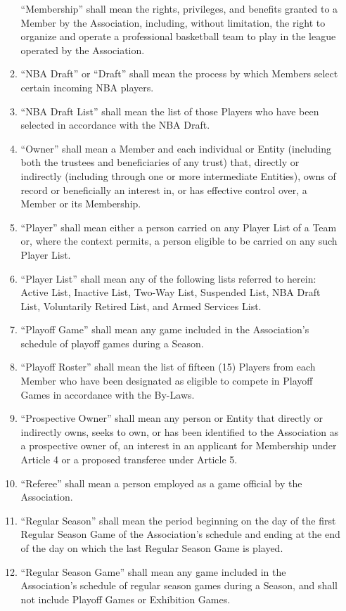 \documentclass[]{book}
\begin{document}
\begin{enumerate}
\begin{enumerate}
    ``Membership'' shall mean the rights, privileges, and benefits granted to a Member by the Association, including, without limitation, the right to organize and operate a professional basketball team to play in the league operated by the Association.
  \item
    ``NBA Draft'' or ``Draft'' shall mean the process by which Members select certain incoming NBA players.
  \item
    ``NBA Draft List'' shall mean the list of those Players who have been selected in accordance with the NBA Draft.
  \item
    ``Owner'' shall mean a Member and each individual or Entity (including both the trustees and beneficiaries of any trust) that, directly or indirectly (including through one or more intermediate Entities), owns of record or beneficially an interest in, or has effective control over, a Member or its Membership.
  \item
    ``Player'' shall mean either a person carried on any Player List of a Team or, where the context permits, a person eligible to be carried on any such Player List.
  \item
    ``Player List'' shall mean any of the following lists referred to herein: Active List, Inactive List, Two-Way List, Suspended List, NBA Draft List, Voluntarily Retired List, and Armed Services List.
  \item
    ``Playoff Game'' shall mean any game included in the Association's schedule of playoff games during a Season.
  \item
    ``Playoff Roster'' shall mean the list of fifteen (15) Players from each Member who have been designated as eligible to compete in Playoff Games in accordance with the By-Laws.
  \item
    ``Prospective Owner'' shall mean any person or Entity that directly or indirectly owns, seeks to own, or has been identified to the Association as a prospective owner of, an interest in an applicant for Membership under Article 4 or a proposed transferee under Article 5.
  \item
    ``Referee'' shall mean a person employed as a game official by the Association.
  \item
    ``Regular Season'' shall mean the period beginning on the day of the first Regular Season Game of the Association's schedule and ending at the end of the day on which the last Regular Season Game is played.
  \item
    ``Regular Season Game'' shall mean any game included in the Association's schedule of regular season games during a Season, and shall not include Playoff Games or Exhibition Games.

\end{enumerate}
\end{enumerate}
\end{document}
